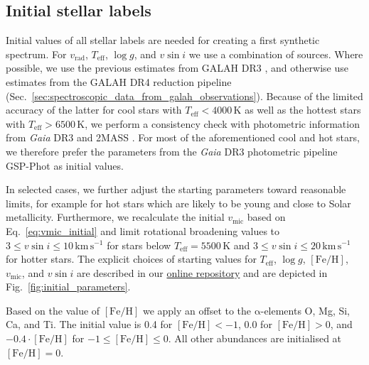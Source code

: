 \documentclass[
  journal=pasa,
  manuscript=research-paper, %
  year=2023,
  volume=37
]{cup-journal}
\newcommand{\Teff}{$T_\mathrm{eff}$\xspace}
\newcommand{\logg}{$\log g$\xspace}
\newcommand{\feh}{$\mathrm{[Fe/H]}$\xspace}
\newcommand{\vmic}{$v_\mathrm{mic}$\xspace}
\newcommand{\vsini}{$v \sin i$\xspace}
\newcommand{\vrad}{$v_\mathrm{rad}$\xspace}
\newcommand{\Gaia}{\textit{Gaia}\xspace}
\begin{document}
\subsection{Initial stellar labels}
\label{sec:initial_stellar_labels}


Initial values of all stellar labels are needed for creating a first synthetic spectrum. For \vrad, \Teff, \logg, and \vsini we use a combination of sources. Where possible, we use the previous estimates from GALAH DR3 \citep{Buder2021}, and otherwise use estimates from the GALAH DR4 reduction pipeline (Sec.~\ref{sec:spectroscopic_data_from_galah_observations}). Because of the limited accuracy of the latter for cool stars with $T_\text{eff} < 4000\,\mathrm{K}$ as well as the hottest stars with $T_\text{eff} > 6500\,\mathrm{K}$, we perform a consistency check with photometric information from \Gaia DR3 \citep{Brown2021} and 2MASS \citep{Skrutskie2006}. For most of the aforementioned cool and hot stars, we therefore prefer the parameters from the \Gaia DR3 photometric pipeline GSP-Phot \citep{Andrae2022,Fouesneau2022} as initial values.

In selected cases, we further adjust the starting parameters toward reasonable limits, for example for hot stars which are likely to be young and close to Solar metallicity. Furthermore, we recalculate the initial \vmic based on Eq.~\ref{eq:vmic_initial} and limit rotational broadening values to $3 \leq v \sin i \leq 10\,\mathrm{km\,s^{-1}}$ for stars below $T_\text{eff} = 5500\,\mathrm{K}$ and $3 \leq v \sin i \leq 20\,\mathrm{km\,s^{-1}}$ for hotter stars. The explicit choices of starting values for \Teff, \logg, \feh, \vmic, and \vsini are described in our \href{https://github.com/svenbuder/GALAH_DR4/blob/main/spectrum_analysis/galah_dr4_initial_parameters.ipynb}{online repository} and are depicted in Fig.~\ref{fig:initial_parameters}.

Based on the value of \feh we apply an offset to the $\mathrm{\alpha}$-elements O, Mg, Si, Ca, and Ti. The initial value is 0.4 for $\mathrm{[Fe/H]} < -1$, 0.0 for $\mathrm{[Fe/H]} > 0$, and $-0.4\cdot \mathrm{[Fe/H]}$ for $-1 \leq \mathrm{[Fe/H]} \leq 0$. All other abundances are initialised at $\mathrm{[Fe/H]} = 0$.

\end{document}
